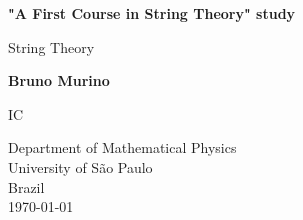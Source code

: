 \begin{titlepage}
    \begin{center}
        \vspace*{1cm}
        
        \Huge
        \textbf{"A First Course in String Theory" study}
        
        \vspace{0.5cm}
        \LARGE
        String Theory
        
        \vspace{1.5cm}
        
        \textbf{Bruno Murino}
        
        \vfill
        
        IC
        
        \vspace{0.8cm}
        
        
        \Large
        Department of Mathematical Physics\\
        University of São Paulo\\
        Brazil\\
        \today
        
    \end{center}
\end{titlepage}